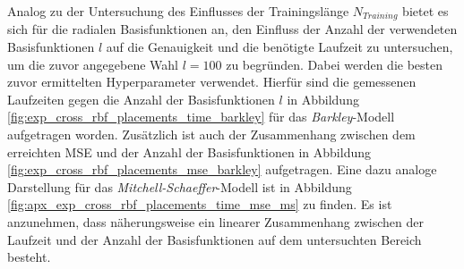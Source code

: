 Analog zu der Untersuchung des Einflusses der Trainingslänge $N_{Training}$ bietet es sich für die radialen Basisfunktionen an, den Einfluss der Anzahl der verwendeten Basisfunktionen $l$ auf die Genauigkeit und die benötigte Laufzeit zu untersuchen, um die zuvor angegebene Wahl $l=100$ zu begründen. Dabei werden die besten zuvor ermittelten Hyperparameter verwendet. Hierfür sind die gemessenen Laufzeiten gegen die Anzahl der Basisfunktionen $l$ in Abbildung \ref{fig:exp_cross_rbf_placements_time_barkley} für das \textit{Barkley}-Modell aufgetragen worden. Zusätzlich ist auch der Zusammenhang zwischen dem erreichten MSE und der Anzahl der Basisfunktionen in Abbildung \ref{fig:exp_cross_rbf_placements_mse_barkley} aufgetragen. Eine dazu analoge Darstellung für das \textit{Mitchell-Schaeffer}-Modell ist in Abbildung \ref{fig:apx_exp_cross_rbf_placements_time_mse_ms} zu finden. Es ist anzunehmen, dass näherungsweise ein linearer Zusammenhang zwischen der Laufzeit und der Anzahl der Basisfunktionen auf dem untersuchten Bereich besteht.\\

